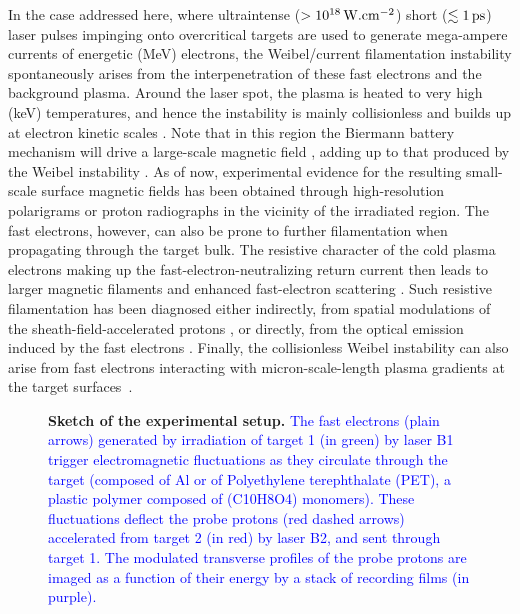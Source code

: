 \documentclass[aps,showpacs,superscriptaddress]{revtex4}
\begin{document}
In the case addressed here, where ultraintense ($>10^{18}\,\rm W.cm^{-2}$) short ($\lesssim 1\,\rm ps$) laser pulses impinging onto overcritical targets are used to generate mega-ampere currents of energetic (MeV) electrons, the Weibel/current filamentation instability spontaneously arises from the interpenetration of these fast electrons and the background plasma. Around the laser spot, the plasma is heated to very high (keV) temperatures, and hence the instability is mainly collisionless and builds up at electron kinetic scales \cite{PRL_Adam_2006}. Note that in this region the Biermann battery mechanism will drive a large-scale magnetic field \cite{RSI_Albertazzi_2015}, adding up to that produced by the Weibel instability \cite{PRL_Schoeffler_2014}.
As of now, experimental evidence for the resulting small-scale surface magnetic fields has been obtained through high-resolution polarigrams \cite{PNAS_Mondal_2012} or proton radiographs \cite{PRL_Romagnani_2019} in the vicinity of the irradiated region. The fast electrons, however, can also be prone to further filamentation when propagating through the target bulk. The resistive character of the cold plasma electrons making up the fast-electron-neutralizing return current \cite{POP_Gremillet_2002} then leads to larger magnetic filaments \cite{JPP_Fiore_2010} and enhanced fast-electron scattering \cite{POP_Yang_2016}. Such resistive filamentation has been diagnosed either indirectly, from spatial modulations of the sheath-field-accelerated protons \cite{PRL_Fuchs_2003, PRL_MacLellan_2013}, or directly, from the optical emission induced by the fast electrons  \cite{PRL_Storm_2009}. Finally, the collisionless Weibel instability can also arise from fast electrons interacting with micron-scale-length plasma gradients at the target surfaces~\cite{PRE_Wei_2004, PRL_Quinn_2012, NJP_Metzkes_2014, PRL_Gode_2017, NJP_Scott_2017}.

\begin{figure}[tbh!]
\caption{\label{fig:xp} \textbf{Sketch of the experimental setup.} 
\textcolor{blue}{The fast electrons (plain arrows) generated by irradiation of target 1 (in green) by laser B1 trigger electromagnetic fluctuations as they circulate through the target (composed of Al or of Polyethylene terephthalate (PET), a plastic polymer composed of (C10H8O4) monomers). These fluctuations deflect the probe protons (red dashed arrows) accelerated from target 2 (in red) by laser B2, and sent through target 1. The modulated transverse profiles of the probe protons are imaged as a function of their energy by a stack of recording films (in purple).}}
\end{figure}
\end{document}
